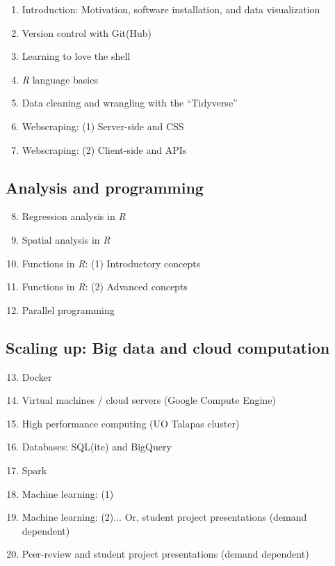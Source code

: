 \documentclass[12]{article}
\begin{document}
\begin{enumerate}
	\item Introduction: Motivation, software installation, and data visualization
	\item Version control with Git(Hub)
	\item Learning to love the shell
	\item \textit{R} language basics
	\item Data cleaning and wrangling with the ``Tidyverse''
	\item Webscraping: (1) Server-side and CSS
	\item Webscraping: (2) Client-side and APIs
\end{enumerate}

\subsection*{Analysis and programming}

\begin{enumerate}
	\setcounter{enumi}{7}
	\item Regression analysis in \textit{R}
	\item Spatial analysis in \textit{R}
	\item Functions in \textit{R}: (1) Introductory concepts
	\item Functions in \textit{R}: (2) Advanced concepts
	\item Parallel programming
\end{enumerate}

\subsection*{Scaling up: Big data and cloud computation}

\begin{enumerate}
	\setcounter{enumi}{12}
	\item Docker
	\item Virtual machines / cloud servers (Google Compute Engine)
	\item High performance computing (UO Talapas cluster) 
	\item Databases: SQL(ite) and BigQuery
	\item Spark
	\item Machine learning: (1)
	\item Machine learning: (2)... Or, student project presentations (demand dependent)
	\item Peer-review and student project presentations (demand dependent)
\end{enumerate}
\end{document}
